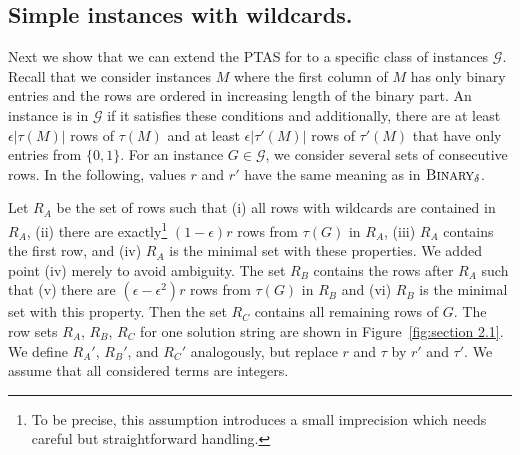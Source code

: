 \subsection{Simple instances with wildcards.}\label{sec:swc}

Next we show that we can extend the PTAS for \BMEC to a specific class of \GMEC instances $\mathcal{G}$.
Recall that we consider \GMEC instances $M$ where the first column of $M$ has only binary entries and the rows are ordered in increasing length of the binary part.
An instance is in $\mathcal{G}$ if it satisfies these conditions and additionally, there are at least $\epsilon |\tau(M)|$ rows of $\tau(M)$ and at least $\epsilon |\tau'(M)|$ rows of $\tau'(M)$ that have only entries from $\{0,1\}$. 
For an instance $G \in \mathcal{G}$, we consider several sets of consecutive rows. 
In the following, values $r$ and $r'$ have the same meaning as in $\textsc{Binary}_\delta$.

Let $R_A$ be the set of rows such that (i) all rows with wildcards are contained in $R_A$, (ii) there are exactly\footnote{To be precise, this assumption introduces a small imprecision which needs careful but straightforward handling.}
$(1-\epsilon) r$ rows from $\tau(G)$ in $R_A$, (iii) $R_A$ contains the first row, and (iv) $R_A$ is the minimal set with these properties. We added point (iv) merely to avoid ambiguity. 
The set $R_B$ contains the rows after $R_A$ such that (v) there are $(\epsilon - \epsilon^2)r$ rows from $\tau(G)$ in $R_B$ and (vi) $R_B$ is the minimal set with this property.
Then the set $R_C$ contains all remaining rows of $G$. The row sets $R_A$, $R_B$, $R_C$ for one solution string are shown in Figure~\ref{fig:section 2.1}.
We define $R_A'$, $R_B'$, and $R_C'$ analogously, but replace $r$ and $\tau$ by $r'$ and $\tau'$.
We assume that all considered terms are integers.

